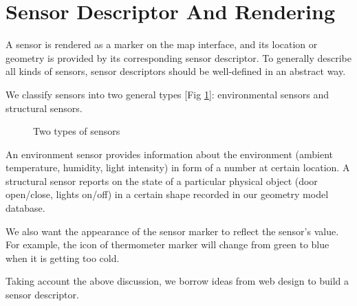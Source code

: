 \documentclass{article}
\begin{document}
\section{Sensor Descriptor And Rendering}

A sensor is rendered as a marker on the map interface, and its location or geometry is provided by its corresponding sensor descriptor. To generally describe all kinds of sensors, sensor descriptors should be well-defined in an abstract way. 

We classify sensors into two general types [Fig \ref{fig:sensortype}]: environmental sensors and structural sensors. 

\begin{figure}[htbp]
\centering
{}
\caption{Two types of sensors}\label{fig:sensortype}
\end{figure}

An environment sensor provides information about the environment (ambient temperature, humidity, light intensity) in form of a number at certain location. A structural sensor reports on the state of a particular physical object (door open/close, lights on/off) in a certain shape recorded in our geometry model database.

We also want the appearance of the sensor marker to reflect the sensor's value. For example, the icon of thermometer marker will change from green to blue when it is getting too cold.

Taking account the above discussion, we borrow ideas from web design to build a sensor descriptor.
\end{document}
